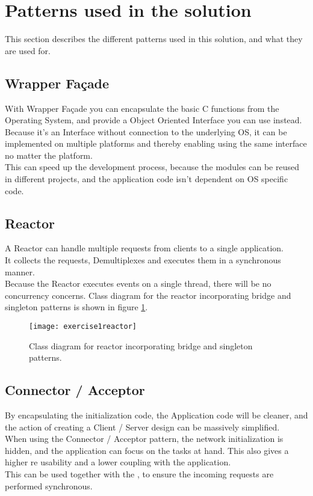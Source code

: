 \documentclass[Main]{subfiles}
\begin{document}
\section{Patterns used in the solution}
This section describes the different patterns used in this solution, and what they are used for.
\subsection{Wrapper Façade}
With Wrapper Façade you can encapsulate the basic C functions from the Operating System, and provide a Object Oriented Interface you can use instead.\\
Because it's an Interface without connection to the underlying OS, it can be implemented on multiple platforms and thereby enabling using the same interface no matter the platform.\\
This can speed up the development process, because the modules can be reused in different projects, and the application code isn't dependent on OS specific code.
\subsection{Reactor}
A Reactor can handle multiple requests from clients to a single application.\\
It collects the requests, Demultiplexes and executes them in a synchronous manner.\\
Because the Reactor executes events on a single thread, there will be no concurrency concerns. Class diagram for the reactor incorporating bridge and singleton patterns is shown in figure \ref{fig:reactoruml}.

\begin{figure}[hbtp]
\centering
\texttt{[image: exercise1reactor]}
\caption{Class diagram for reactor incorporating bridge and singleton patterns.}
\label{fig:reactoruml}
\end{figure}

\subsection{Connector / Acceptor}
By encapsulating the initialization code, the Application code will be cleaner, and the action of creating a Client / Server design can be massively simplified.\\
When using the Connector / Acceptor pattern, the network initialization is hidden, and the application can focus on the tasks at hand.
This also gives a higher re usability and a lower coupling with the application.\\
This can be used together with the , to ensure the incoming requests are performed synchronous. 
\end{document}
